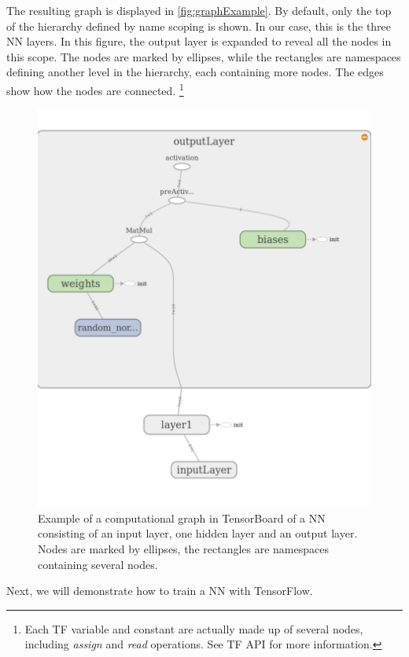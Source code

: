 \documentclass[twoside,english]{uiofysmaster}
\begin{document}
The resulting graph is displayed in \autoref{fig:graphExample}. 
By default, only the top of the hierarchy defined by name scoping is shown. In our case, this
is the three NN layers. In this figure, the output layer is expanded to reveal all the nodes in this scope. 
The nodes are marked by ellipses, while the rectangles are namespaces defining another level in the hierarchy, 
each containing more nodes. The edges show how the nodes are connected. 
\footnote{Each TF variable and constant are actually made up of several nodes, including \textit{assign} and 
\textit{read} operations. See TF API for more information.}
\begin{figure}[H]
\centering
  \includegraphics[width=\linewidth]{Figures/Implementation/tensorBoardExample.pdf}
  \caption{Example of a computational graph in TensorBoard of a NN consisting of an input layer, one 
	   hidden layer and an output layer. Nodes are marked by ellipses, the rectangles are namespaces
	   containing several nodes.} 
  \label{fig:graphExample}
\end{figure}
Next, we will demonstrate how to train a NN with TensorFlow. 
\end{document}
